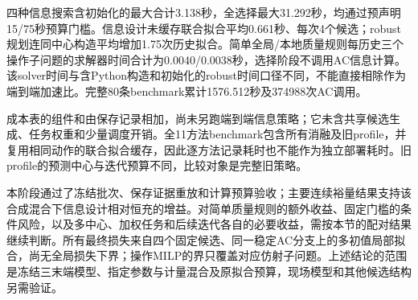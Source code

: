 四种信息搜索含初始化的最大合计3.138秒，全选择最大31.292秒，均通过预声明15/75秒预算门槛。信息设计未缓存联合拟合平均0.661秒、每次4个候选；robust规划连同中心构造平均增加1.75次历史拟合。简单全局/本地质量规则每历史三个操作子问题的求解器时间合计为0.0040/0.0038秒，选择阶段不调用AC信息计算。该solver时间与含Python构造和初始化的robust时间口径不同，不能直接相除作为端到端加速比。完整80条benchmark累计1576.512秒及374988次AC调用。

成本表的组件和由保存记录相加，尚未另跑端到端信息策略；它未含共享候选生成、任务权重和少量调度开销。全11方法benchmark包含所有消融及旧profile，并复用相同动作的联合拟合缓存，因此逐方法记录耗时也不能作为独立部署耗时。旧profile的预测中心与迭代预算不同，比较对象是完整旧策略。

本阶段通过了冻结批次、保存证据重放和计算预算验收；主要连续裕量结果支持该合成混合下信息设计相对恒充的增益。对简单质量规则的额外收益、固定门槛的条件风险，以及多中心、加权任务和后续迭代各自的必要收益，需按本节的配对结果继续判断。所有最终损失来自四个固定候选、同一稳定AC分支上的多初值局部拟合，尚无全局损失下界；操作MILP的界只覆盖对应仿射子问题。上述结论的范围是冻结三末端模型、指定参数与计量混合及原拟合预算，现场模型和其他候选结构另需验证。

